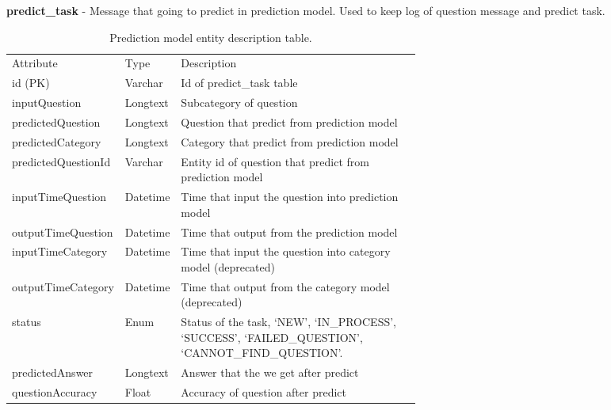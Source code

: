 \documentclass[12pt,oneside,openright,a4paper]{cpe-english-project}
\begin{document}
\textbf{predict\_task} - Message that going to predict in prediction model. Used to keep log of question message and predict task.
\begin{table}[ht]
	\caption{Prediction model entity description table.}
	\label{tab:Prediction model entity description table.}
\begin{adjustbox}{width=\textwidth}
\begin{tabular}{llp{0.6\linewidth}l}
\rowcolor[HTML]{5B9BD5} 
Attribute         & Type     & Description                                                                                                 \\
\rowcolor[HTML]{DEEAF6} 
id (PK)           & Varchar  & Id of predict\_task table                                                                                   \\
inputQuestion     & Longtext  & Subcategory of question                                                                                     \\
\rowcolor[HTML]{DEEAF6} 
predictedQuestion & Longtext  & Question that predict from prediction model																	\\
predictedCategory & Longtext  & Category that predict from prediction model                   												\\
\rowcolor[HTML]{DEEAF6} 
predictedQuestionId & Varchar  & Entity id of question that predict from prediction model													\\
inputTimeQuestion      & Datetime & Time that input the question into prediction model							                                \\
\rowcolor[HTML]{DEEAF6} 
outputTimeQuestion      & Datetime & Time that output from the prediction model							                                \\
inputTimeCategory      & Datetime & Time that input the question into category model (deprecated)							               \\
\rowcolor[HTML]{DEEAF6} 
outputTimeCategory      & Datetime & Time that output from the category model (deprecated)							               			\\
status            & Enum     & Status of the task,   ‘NEW’, ‘IN\_PROCESS’, ‘SUCCESS’, ‘FAILED\_QUESTION’, ‘CANNOT\_FIND\_QUESTION’.        \\
\rowcolor[HTML]{DEEAF6} 
predictedAnswer  & Longtext & Answer that the we get after predict	\\
questionAccuracy & Float & Accuracy of question after predict \\

\end{tabular}
\end{adjustbox}
\end{table}
\end{document}
